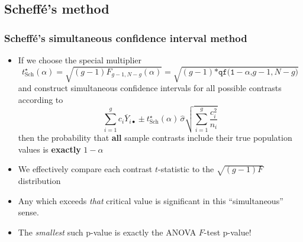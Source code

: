 \documentclass[a4paper]{article}
\begin{document}
\subsection{Scheffé's method}
\subsubsection{Scheffé's simultaneous confidence interval method}
\begin{itemize}
	\item If we choose the special multiplier
	\[
		t^\star_{\text{Sch}}(\alpha)= \sqrt{(g-1)F_{g-1,N-g}(\alpha)} = \sqrt{(g-1)\texttt{*qf(1}-\alpha\texttt{,}g-1,N-g\texttt{)}}
	\]
	and construct simultaneous confidence intervals for all possible contrasts according to
	\[
		\sum_{i=1}^gc_i \overline Y_{i\bullet} \pm t^\star_{\text{Sch}}(\alpha)\,\hat{\sigma} \textstyle\sqrt{\sum_{i=1}^g \frac{c_i^2}{n_i}}
	\]
	then the probability that \textbf{all} sample contrasts include their true population values is \textbf{exactly} \( 1 - \alpha \) 
	\item We effectively compare each contrast \( t \)-statistic to the \( \sqrt{(g-1)F} \) distribution
	\item Any which exceeds \textit{that} critical value is significant in this ``simultaneous'' sense.
	\item The \textit{smallest} such p-value is exactly the ANOVA \( F \)-test p-value!
\end{itemize}
\end{document}
